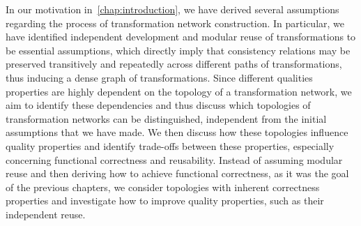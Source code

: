 In our motivation in~\autoref{chap:introduction}, we have derived several assumptions regarding the process of transformation network construction.
In particular, we have identified independent development and modular reuse of transformations to be essential assumptions, which directly imply that consistency relations may be preserved transitively and repeatedly across different paths of transformations, thus inducing a dense graph of transformations.
Since different qualities properties are highly dependent on the topology of a transformation network, we aim to identify these dependencies and thus discuss which topologies of transformation networks can be distinguished, independent from the initial assumptions that we have made.
We then discuss how these topologies influence quality properties and identify trade-offs between these properties, especially concerning functional correctness and reusability.
Instead of assuming modular reuse and then deriving how to achieve functional correctness, as it was the goal of the previous chapters, we consider topologies with inherent correctness properties and investigate how to improve quality properties, such as their independent reuse.




